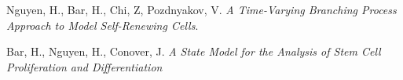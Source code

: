 \documentclass[12pt,a4paper]{article}
\newenvironment{list1}{
  \begin{list}{\ding{113}}{%
      \setlength{\itemsep}{0in}
      \setlength{\parsep}{0in} \setlength{\parskip}{0in}
      \setlength{\topsep}{0in} \setlength{\partopsep}{0in}
      \setlength{\leftmargin}{0.17in}}}{\end{list}}
\begin{document}
\begin{list1}
\item[-] Nguyen, H.,  Bar, H.,  Chi, Z,  Pozdnyakov, V. \textit{A Time-Varying Branching Process Approach to Model Self-Renewing Cells}. 
\item[-] Bar, H., Nguyen, H., Conover, J. \textit{A State Model for the Analysis of Stem Cell
Proliferation and Differentiation}
\end{list1}
  
\end{document}
